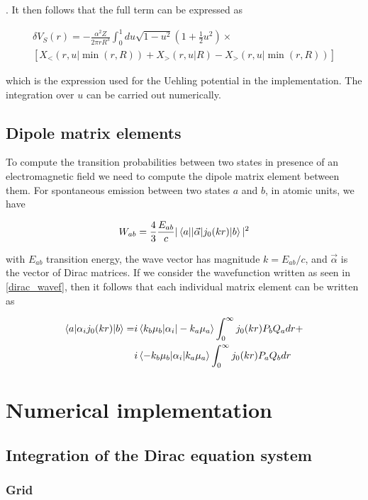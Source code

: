 \documentclass[]{report}
\begin{document}
. It then follows that the full term can be expressed as

\begin{multline}
\delta V_S(r) =  -\frac{\alpha^2Z}{2\pi rR^3}\int_0^1 du \sqrt{1-u^2}\left(1+\frac{1}{2}u^2\right) \times \\
\left[X_{<}(r, u | \min(r, R)) + X_{>}(r, u | R) -X_{>}(r, u | \min(r, R))\right]
\end{multline}

which is the expression used for the Uehling potential in the implementation. The integration over $u$ can be carried out numerically.

\section{Dipole matrix elements}

To compute the transition probabilities between two states in presence of an electromagnetic field we need to compute the dipole matrix element between them. For spontaneous emission between two states $a$ and $b$, in atomic units, we have \cite{payne1955}

\begin{equation}
W_{ab} = \frac{4}{3}\frac{E_{ab}}{c}|\braket{a||\vec{\alpha}|j_0(kr)|b}|^2
\end{equation}

with $E_{ab}$ transition energy, the wave vector has magnitude $k=E_{ab}/c$, and $\vec{\alpha}$ is the vector of Dirac matrices.
If we consider the wavefunction written as seen in \ref{dirac_wavef}, 
then it follows that each individual matrix element can be written as

\begin{align}
\braket{a|\alpha_ij_0(kr)|b} = & i\braket{k_b\mu_b|\alpha_i|-k_a\mu_a}\int_{0}^{\infty}j_0(kr)P_bQ_a dr + \\
& i\braket{-k_b\mu_b|\alpha_i|k_a\mu_a}\int_{0}^{\infty}j_0(kr)P_aQ_b dr
\end{align}


\chapter{Numerical implementation}

\section{Integration of the Dirac equation system}

\subsection{Grid}
\end{document}
